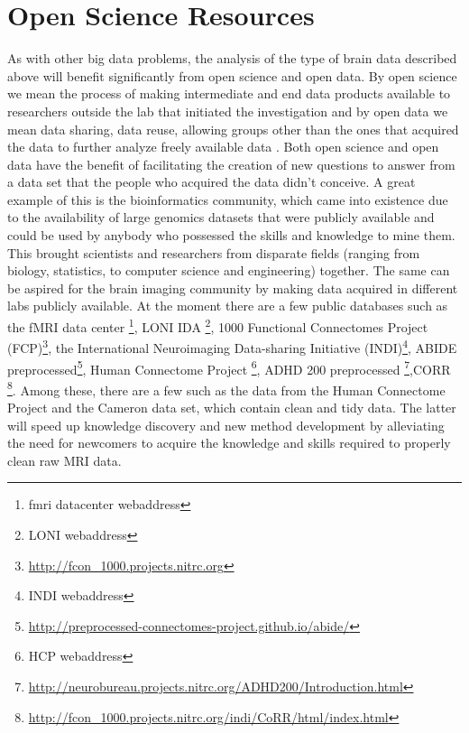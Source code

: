 \section*{Open Science Resources}
As with other big data problems, the analysis of the type of brain data described above will benefit significantly from open science and open data. By open science we mean the process of making intermediate and end data products available to researchers outside the lab that initiated the investigation and by open data we mean data sharing, data reuse, allowing groups other than the ones that acquired the data to further analyze freely available data \cite{Milham2012}. Both open science and open data have the benefit of facilitating the creation of new questions to answer from a data set that the people who acquired the data didn't conceive. A great example of this is the bioinformatics community, which came into existence due to the availability of large genomics datasets that were publicly available and could be used by anybody who possessed the skills and knowledge to mine them\cite{VanHorn2013}. This brought scientists and researchers from disparate fields (ranging from biology, statistics, to computer science and engineering) together. The same can be aspired for the brain imaging community by making data acquired in different labs publicly available. At the moment there are a few public databases such as the fMRI data center \footnote{fmri datacenter webaddress}, LONI IDA \footnote{LONI webaddress}, 1000 Functional Connectomes Project (FCP)\footnote{\url{http://fcon_1000.projects.nitrc.org}}, the International Neuroimaging Data-sharing Initiative (INDI)\footnote{INDI webaddress}, ABIDE preprocessed\footnote{\url{http://preprocessed-connectomes-project.github.io/abide/}}, Human Connectome Project \footnote{HCP webaddress}, ADHD 200 preprocessed \footnote{\url{http://neurobureau.projects.nitrc.org/ADHD200/Introduction.html}},CORR \footnote{\url{http://fcon_1000.projects.nitrc.org/indi/CoRR/html/index.html}}. Among these, there are a few such as the data from the Human Connectome Project and the Cameron data set, which contain clean and tidy data. The latter will speed up knowledge discovery and new method development by alleviating the need for newcomers to acquire the knowledge and skills required to properly clean raw MRI data. 
